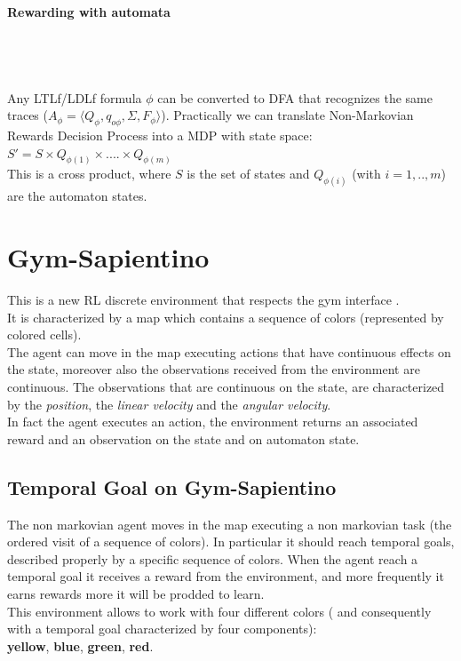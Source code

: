 \documentclass{article}
\begin{document}
\paragraph{Rewarding with automata}\\
\noindent\\\\
Any LTLf/LDLf formula $\phi$ can be converted to DFA that recognizes the same traces ($A_\phi=\langle Q_\phi, q_{o\phi},\Sigma, F_\phi\rangle$). Practically we can translate Non-Markovian Rewards Decision Process into a MDP with state space:
$S'= S \times Q_{\phi(1)}\times .... \times Q_{\phi(m)}$\\
\noindent
This is a cross product, where $S$ is the set of states and $Q_{\phi(i)}$ (with $i=1,..,m$) are the automaton states.



\section{Gym-Sapientino}
This is a new RL discrete environment that respects the gym interface \cite{Gym-Sapientino}.\\
It is characterized by a map which contains a sequence of colors (represented by colored cells). \\
The agent can move in the map executing actions that have continuous effects on the state, moreover also the observations received from the environment are continuous. The observations that are continuous on the state, are characterized by the \textit{position}, the \textit{linear velocity} and  the \textit{angular velocity}. \\
In fact the agent executes an action, the environment returns an associated reward and an observation on the state and on automaton state.

\subsection{Temporal Goal on Gym-Sapientino}

The non markovian agent moves in the map executing a non markovian task (the ordered visit of a sequence of colors). 
In particular it should reach
temporal goals, described properly by a specific sequence of colors. When the agent reach a temporal goal it receives a reward from the environment, and more frequently it earns rewards more it will be prodded to learn.\\
This environment allows to work with four different colors ( and consequently with a temporal goal characterized by four components):\\
{\color{myyellow}\textbf{yellow}}, {\color {blue} \textbf{blue}}, {\color{codegreen} \textbf{green}}, {\color{red} \textbf{red}}.
\end{document}
